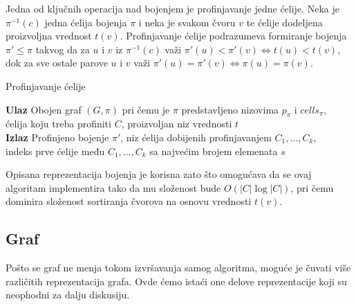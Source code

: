 \documentclass[12pt,oneside]{memoir}
\theoremstyle{definition}
\begin{document}
   Jedna od ključnih operacija nad bojenjem je profinjavanje jedne ćelije. Neka
   je $\pi^{-1}(c)$ jedna ćelija bojenja $\pi$ i neka je svakom čvoru $v$ te
   ćelije dodeljena proizvoljna vrednost $t(v)$. Profinjavanje ćelije
   podrazumeva formiranje bojenja $\pi' \leq \pi$ takvog da za $u$ i $v$ iz
   $\pi^{-1}(c)$ važi $\pi'(u) < \pi'(v) \iff t(u) < t(v)$, dok za sve ostale
   parove $u$ i $v$ važi $\pi'(u) = \pi'(v) \iff \pi(u) = \pi(v)$.

  \begin{algorithm}[H]
	  \caption{Profinjavanje ćelije}
	  \textbf{Ulaz}
		  Obojen graf $(G, \pi)$ pri čemu je $\pi$ predstavljeno nizovima
		  $p_\pi$ i $cells_\pi$,\\ ćelija koju treba profiniti $C$,
		  proizvoljan niz vrednosti $t$\\
	  \textbf{Izlaz}
	  	  Profinjeno bojenje $\pi'$,
		  niz ćelija dobijenih profinjavanjem $C_1, \dots, C_k$,\\
		  indeks prve ćelije među $C_1, \dots, C_k$ sa najvećim brojem elemenata $s$
	  \begin{algorithmic}[1]
			\EndFor
		  \EndFor
		  \State{}
		  \EndProcedure
	  \end{algorithmic}
  \end{algorithm}

  Opisana reprezentacija bojenja je korisna zato što omogućava da se ovaj
  algoritam implementira tako da mu složenost bude $O(|C| \log |C|)$, pri čemu
  dominira složenost sortiranja čvorova na osnovu vrednosti $t(v)$.

  \subsection{Graf}

   Pošto se graf ne menja tokom izvršavanja samog algoritma, moguće je čuvati
   više različitih reprezentacija grafa. Ovde ćemo istaći one delove
   reprezentacije koji su neophodni za dalju diskusiju.
\end{document}
